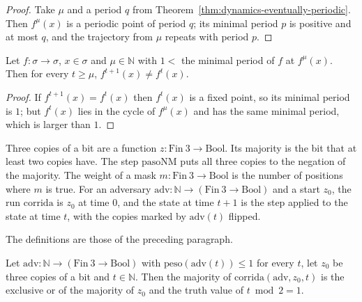 \begin{proof}
  \leanok
  Take $\mu$ and a period $q$ from Theorem~\ref{thm:dynamics-eventually-periodic}. Then $f^{\mu}(x)$
  is a periodic point of period $q$; its minimal period $p$ is positive and at most $q$, and the
  trajectory from $\mu$ repeats with period $p$.
\end{proof}

\begin{theorem}
  \label{thm:dynamics-symmetry-break}
  \leanok
  Let $f : \sigma \to \sigma$, $x \in \sigma$ and $\mu \in \mathbb{N}$ with
  $1 < $ the minimal period of $f$ at $f^{\mu}(x)$. Then for every $t \ge \mu$,
  $f^{t+1}(x) \ne f^{t}(x)$.
  \own{}
\end{theorem}

\begin{proof}
  \leanok
  If $f^{t+1}(x) = f^{t}(x)$ then $f^{t}(x)$ is a fixed point, so its minimal period is $1$; but
  $f^{t}(x)$ lies in the cycle of $f^{\mu}(x)$ and has the same minimal period, which is larger
  than $1$.
\end{proof}

Three copies of a bit are a function $z : \mathrm{Fin}\ 3 \to \mathrm{Bool}$. Its majority is the
bit that at least two copies have. The step $\mathrm{pasoNM}$ puts all three copies to the negation
of the majority. The weight of a mask $m : \mathrm{Fin}\ 3 \to \mathrm{Bool}$ is the number of
positions where $m$ is true. For an adversary $\mathrm{adv} : \mathbb{N} \to (\mathrm{Fin}\ 3 \to
\mathrm{Bool})$ and a start $z_0$, the run $\mathrm{corrida}$ is $z_0$ at time $0$, and the
state at time $t+1$ is the step applied to the state at time $t$, with the copies marked by
$\mathrm{adv}(t)$ flipped.

\begin{definition}
  \label{def:dynamics-three-copies}
  \leanok
  The definitions are those of the preceding paragraph.
  \own{}
\end{definition}

\begin{theorem}
  \label{thm:dynamics-robust-phase}
  \leanok
  Let $\mathrm{adv} : \mathbb{N} \to (\mathrm{Fin}\ 3 \to \mathrm{Bool})$ with
  $\mathrm{peso}(\mathrm{adv}(t)) \le 1$ for every $t$, let $z_0$ be three copies of a bit and
  $t \in \mathbb{N}$. Then the majority of $\mathrm{corrida}(\mathrm{adv}, z_0, t)$ is the exclusive
  or of the majority of $z_0$ and the truth value of $t \bmod 2 = 1$.
  \own{}
\end{theorem}

